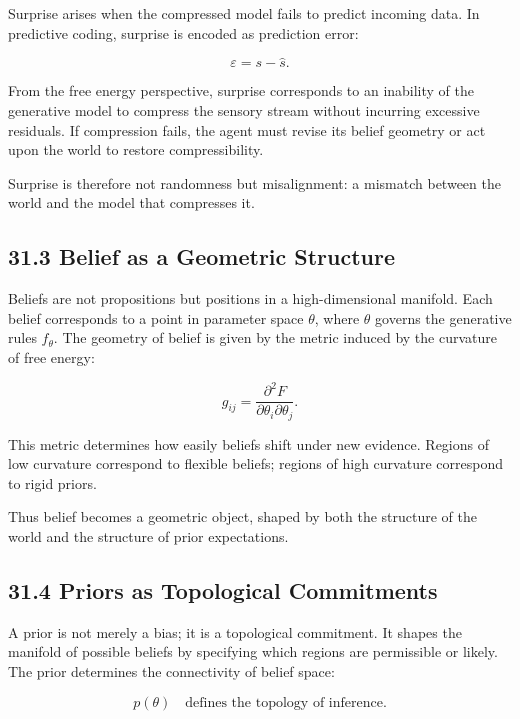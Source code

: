\documentclass[12pt,letterpaper]{article}
\theoremstyle{remark}
\begin{document}
Surprise arises when the compressed model fails to predict incoming data. In predictive coding, surprise is encoded as prediction error:

\[
\varepsilon = s - \hat{s}.
\]

From the free energy perspective, surprise corresponds to an inability of the generative model to compress the sensory stream without incurring excessive residuals. If compression fails, the agent must revise its belief geometry or act upon the world to restore compressibility.

Surprise is therefore not randomness but misalignment: a mismatch between the world and the model that compresses it.

\subsection{31.3 Belief as a Geometric Structure}

Beliefs are not propositions but positions in a high-dimensional manifold. Each belief corresponds to a point in parameter space $\theta$, where $\theta$ governs the generative rules \(f_\theta\). The geometry of belief is given by the metric induced by the curvature of free energy:

\[
g_{ij} = \frac{\partial^2 F}{\partial \theta_i \partial \theta_j}.
\]

This metric determines how easily beliefs shift under new evidence. Regions of low curvature correspond to flexible beliefs; regions of high curvature correspond to rigid priors.

Thus belief becomes a geometric object, shaped by both the structure of the world and the structure of prior expectations.

\subsection{31.4 Priors as Topological Commitments}

A prior is not merely a bias; it is a topological commitment. It shapes the manifold of possible beliefs by specifying which regions are permissible or likely. The prior determines the connectivity of belief space:

\[
p(\theta) \quad \text{defines the topology of inference.}
\]
\end{document}
